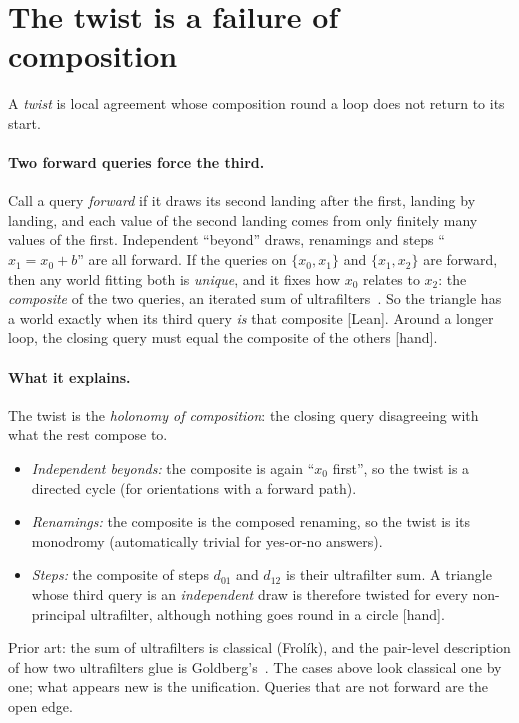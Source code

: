 \documentclass[11pt]{article}
\newcommand{\st}[1]{\textsf{\small[#1]}}
\begin{document}
\section{The twist is a failure of composition}\label{sec:composition}
A \emph{twist} is local agreement whose composition round a loop does not return
to its start.

\paragraph{Two forward queries force the third.} Call a query \emph{forward} if it
draws its second landing after the first, landing by landing, and each value of
the second landing comes from only finitely many values of the first.
Independent ``beyond'' draws, renamings and steps ``$x_1=x_0+b$'' are all
forward. If the queries on $\{x_0,x_1\}$ and $\{x_1,x_2\}$ are forward, then any
world fitting both is \emph{unique}, and it fixes how $x_0$ relates to $x_2$:
the \emph{composite} of the two queries, an iterated sum of
ultrafilters~\cite{goldberg2025}. So the triangle has a world exactly when its third
query \emph{is} that composite \st{Lean}. Around a longer loop, the closing query
must equal the composite of the others \st{hand}.

\paragraph{What it explains.} The twist is the \emph{holonomy of composition}: the
closing query disagreeing with what the rest compose to.
\begin{itemize}[nosep]
  \item \emph{Independent beyonds:} the composite is again ``$x_0$ first'', so
    the twist is a directed cycle (for orientations with a forward path).
  \item \emph{Renamings:} the composite is the composed renaming, so the twist is
    its monodromy (automatically trivial for yes-or-no answers).
  \item \emph{Steps:} the composite of steps $d_{01}$ and $d_{12}$ is their
    ultrafilter sum. A triangle whose third query is an \emph{independent} draw is
    therefore twisted for every non-principal ultrafilter, although nothing goes
    round in a circle \st{hand}.
\end{itemize}
Prior art: the sum of ultrafilters is classical (Frolík), and the pair-level
description of how two ultrafilters glue is Goldberg's~\cite{goldberg2025}. The
cases above look classical one by one; what appears new is the unification.
Queries that are not forward are the open edge.
\end{document}
